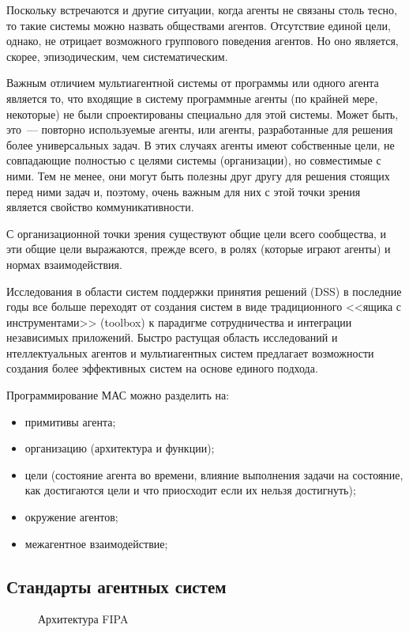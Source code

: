 Поскольку встречаются и другие ситуации, когда агенты не связаны столь тесно, то такие системы можно назвать обществами агентов. Отсутствие единой цели, однако, не отрицает возможного группового поведения агентов. Но оно является, скорее, эпизодическим, чем систематическим.

Важным отличием мультиагентной системы от программы или одного агента является то, что входящие в систему программные агенты (по крайней мере, некоторые) не были спроектированы специально для этой системы. Может быть, это~--- повторно используемые агенты, или агенты, разработанные для решения более универсальных задач. В этих случаях агенты имеют собственные цели, не совпадающие полностью с целями системы (организации), но совместимые с ними. Тем не менее, они могут быть полезны друг другу для решения стоящих перед ними задач и, поэтому, очень важным для них с этой точки зрения является свойство коммуникативности.

С организационной точки зрения существуют общие цели всего сообщества, и эти общие цели выражаются, прежде всего, в ролях (которые играют агенты) и нормах взаимодействия.

Исследования в области систем поддержки принятия решений (DSS) в последние годы все больше переходят от создания систем в виде традиционного <<ящика с инструментами>> (toolbox) к парадигме сотрудничества и интеграции независимых приложений. Быстро растущая область исследований и нтеллектуальных агентов и мультиагентных систем предлагает возможности создания более эффективных систем на основе единого подхода.

Программирование МАС можно разделить на:
\begin{itemize}
\item примитивы агента;
\item организацию (архитектура и функции);
\item цели (состояние агента во времени, влияние выполнения задачи на состояние, как достигаются цели и что приосходит если их нельзя достигнуть);
\item окружение агентов;
\item межагентное взаимодействие;
\end{itemize}

\subsection{Стандарты агентных систем}
\begin{figure}[h]
\caption{Архитектура FIPA}
\label{1:fipa}
\end{figure}

